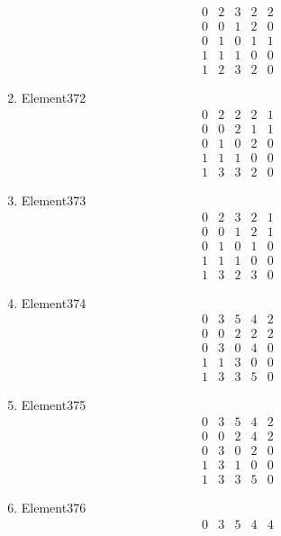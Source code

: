 \documentclass[12pt]{article}
\begin{document}
\begin{multicols}{3}
\begin{enumerate}
\begin{equation*}
\begin{array}{ccccc}
0&2&3&2&2\\
0&0&1&2&0\\
0&1&0&1&1\\
1&1&1&0&0\\
1&2&3&2&0
\end{array}
\end{equation*}
\item Element372
\begin{equation*}
\begin{array}{ccccc}
0&2&2&2&1\\
0&0&2&1&1\\
0&1&0&2&0\\
1&1&1&0&0\\
1&3&3&2&0
\end{array}
\end{equation*}
\item Element373
\begin{equation*}
\begin{array}{ccccc}
0&2&3&2&1\\
0&0&1&2&1\\
0&1&0&1&0\\
1&1&1&0&0\\
1&3&2&3&0
\end{array}
\end{equation*}
\item Element374
\begin{equation*}
\begin{array}{ccccc}
0&3&5&4&2\\
0&0&2&2&2\\
0&3&0&4&0\\
1&1&3&0&0\\
1&3&3&5&0
\end{array}
\end{equation*}
\item Element375
\begin{equation*}
\begin{array}{ccccc}
0&3&5&4&2\\
0&0&2&4&2\\
0&3&0&2&0\\
1&3&1&0&0\\
1&3&3&5&0
\end{array}
\end{equation*}
\item Element376
\begin{equation*}
\begin{array}{ccccc}
0&3&5&4&4\\

\end{array}
\end{equation*}
\end{enumerate}
\end{multicols}
\end{document}
